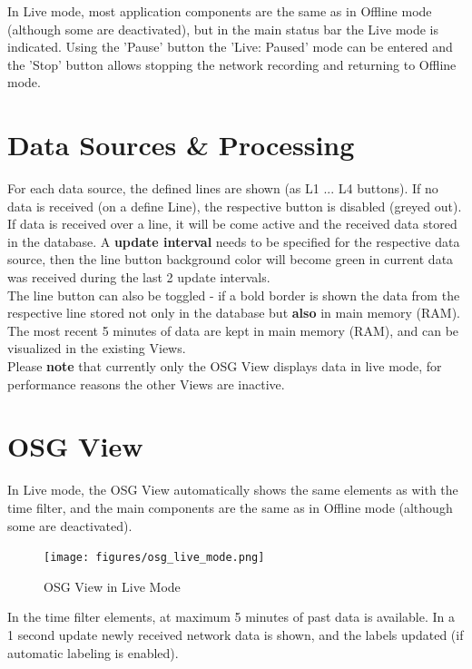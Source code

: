 In Live mode, most application components are the same as in Offline mode (although some are deactivated), but in the main status bar the Live mode is indicated. Using the 'Pause' button the 'Live: Paused' mode can be entered and the 'Stop' button allows stopping the network recording and returning to Offline mode.

\section{Data Sources \& Processing}

For each data source, the defined lines are shown (as L1 ... L4 buttons). If no data is received (on a define Line), the respective button is disabled (greyed out). If data is received over a line, it will be come active and the received data stored in the database. A \textbf{update interval} needs to be specified for the respective data source, then the line button background color will become green in current data was received during the last 2 update intervals. \\

The line button can also be toggled - if a bold border is shown the data from the respective line stored not only in the database but \textbf{also} in main memory (RAM). The most recent 5 minutes of data are kept in main memory (RAM), and can be visualized in the existing Views. \\

Please \textbf{note} that currently only the OSG View displays data in live mode, for performance reasons the other Views are inactive.

\section{OSG View}

In Live mode, the OSG View automatically shows the same elements as with the time filter, and the main components are the same as in Offline mode (although some are deactivated).

\begin{figure}[H]
    \hspace*{-2.5cm}
    \texttt{[image: figures/osg\_live\_mode.png]}
  \caption{OSG View in Live Mode}
\end{figure} 

In the time filter elements, at maximum 5 minutes of past data is available. In a 1 second update newly received network data is shown, and the labels updated (if automatic labeling is enabled). \\

